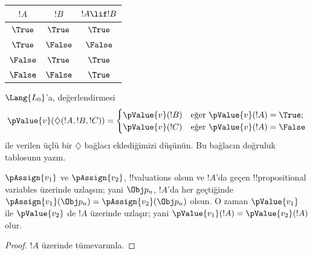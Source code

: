 \begin{explain}
\begin{center}
{  \begin{tabular}{|cc||c|} \hline
    $!A$ & $!B$ & $!A \lif !B$ \\
    \hline \hline
    $\True$ & $\True$ & $\True$ \\
    $\True$ & $\False$ & $\False$ \\
    $\False$ & $\True$ & $\True$ \\
    $\False$ & $\False$ & $\True$ \\
    \hline
  \end{tabular}
}{}
\end{center}
\end{explain}

\begin{prob}
$\Lang{L_0}$'a, değerlendirmesi
\begin{gather*}
  \pValue{v}(\diamondsuit( !A , !B , !C ) ) = \begin{cases}
    \pValue{v}( !B ) &
    \text{eğer $\pValue{v}(!A) = \True$;}\\
    \pValue{v}( !C ) &
    \text{eğer $\pValue{v}(!A) = \False $}
  \end{cases}
\end{gather*}
ile verilen üçlü bir $\diamondsuit$ bağlacı eklediğimizi düşünün. Bu bağlacın
doğruluk tablosunu yazın.
\end{prob}

\begin{thm}
 $\pAssign{v_1}$ ve $\pAssign{v_2}$,
!!{valuation}s olsun ve $!A$'da geçen !!{propositional
variable}s üzerinde uzlaşsın; yani $\Obj p_n$, $!A$'da her geçtiğinde
$\pAssign{v_1}(\Obj p_n) = \pAssign{v_2}(\Obj p_n)$ olsun. O zaman
$\pValue{v_1}$ ile $\pValue{v_2}$ de $!A$ üzerinde uzlaşır; yani
$\pValue{v_1}(!A) = \pValue{v_2}(!A)$ olur.
\end{thm}

\begin{proof}
$!A$ üzerinde tümevarımla.
\end{proof}

